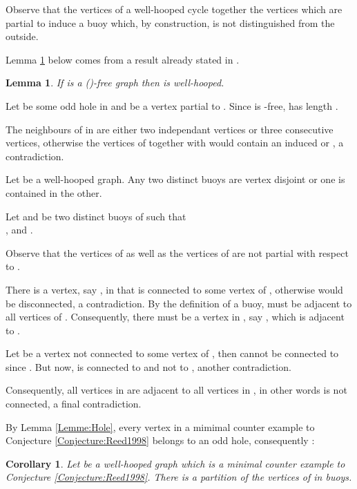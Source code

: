 \documentclass{amsart}
\newtheorem{cor}[thm]{Corollary}
\newtheorem{lem}[thm]{Lemma}
\theoremstyle{definition}
\theoremstyle{remark}
\newenvironment{prf}{{\bf \noindent Proof. } }{\hfill\\}
\newcommand{\wh}{well-hooped\xspace}
\newcommand{\extB}{buoy\xspace}
\newcommand{\extBs}{buoys\xspace}
\begin{document}
Observe that the vertices of a \wh cycle  together the vertices which are partial to  induce a \extB which, by construction, is not distinguished from the outside.



Lemma \ref{lem:P5etLeurComplémentsSontStroumpfs} below comes from a result already stated in \cite{FouGiaMaiThu1995}.
\begin{lem}\label{lem:P5etLeurComplémentsSontStroumpfs}
If  is a ()-free graph then  is \wh.
\end{lem}
\begin{prf}
Let  be some odd hole in  and  be a vertex partial to . Since  is -free,  has length .

The neighbours of  in  are either two independant vertices or three consecutive vertices, otherwise the vertices of  together with  would contain an induced  or , a contradiction.
\end{prf}

\begin{thm} \label{Theorem:Structure_Extended_bouées} 
Let  be a \wh graph. Any two distinct \extBs are vertex disjoint or one is contained in the other.
\end{thm}
\begin{prf}
Let  and  be two distinct \extBs of  such that \\
,  and . 

Observe that the vertices of  
as well as the vertices of  are not partial with respect to .

There is a vertex, say , in  that is connected to some vertex of , otherwise  would be disconnected, a contradiction.
By the definition of a \extB,  must be adjacent to all vertices of .
Consequently, there must be a vertex in , say , which is adjacent to .

Let  be a vertex not connected to some vertex of  , then  cannot be connected to  since . 
But now,  is connected to  and not to , another contradiction.

Consequently, all vertices in  are adjacent to all vertices in , in other words  is not connected, a final contradiction.
\end{prf}

By Lemma \ref{Lemme:Hole}, every vertex in a mimimal counter example to Conjecture \ref{Conjecture:Reed1998} belongs to an odd hole, consequently :
\begin{cor}\label{cor:PartitionStroumpfGraphEnExtendedBuoys}
 Let  be a \wh graph  which is a minimal counter example to Conjecture \ref{Conjecture:Reed1998}. There is a partition of the vertices of  in \extBs.
\end{cor}
\end{document}
